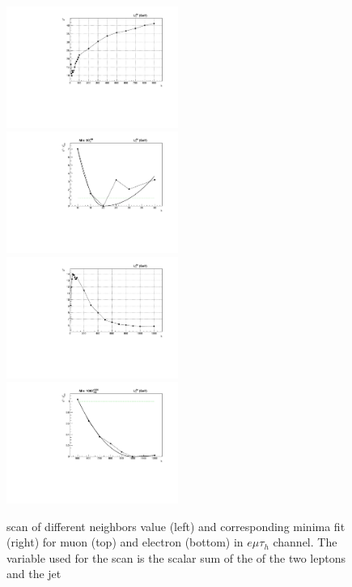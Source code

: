 \begin{figure}
\includegraphics[width=0.5\textwidth]{4_Analisys/pics/8TeV/ProfileNeighbors/EM_Muon/h2taucuts/LT_chi2.pdf}
\includegraphics[width=0.5\textwidth]{4_Analisys/pics/8TeV/ProfileNeighbors/EM_Muon/h2taucuts_LT.pdf} \\
\includegraphics[width=0.5\textwidth]{4_Analisys/pics/8TeV/ProfileNeighbors/EM_Electron/eid12Medium_h2taucuts/LT_chi2.pdf}
\includegraphics[width=0.5\textwidth]{4_Analisys/pics/8TeV/ProfileNeighbors/EM_Electron/eid12Medium_h2taucuts_LT.pdf} \\
\caption{\chisq scan of different neighbors value (left) and corresponding minima fit (right) for muon (top) and electron (bottom) in $e\mu\tau_h$ channel. The variable used for the scan is the scalar sum of the \pT of the two leptons and the jet}
\label{fig:kNN_minima_EMT}
\end{figure}

